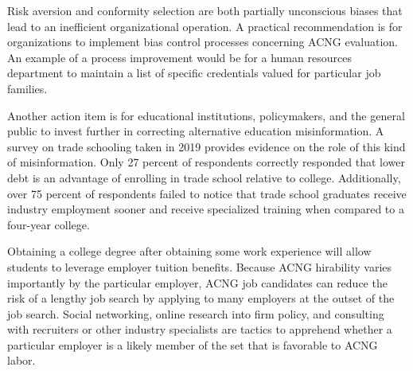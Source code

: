 Risk aversion and conformity selection are both partially unconscious biases that lead to an inefficient organizational operation.
A practical recommendation is for organizations to implement bias control processes concerning ACNG evaluation.
An example of a process improvement would be for a human resources department
to maintain a list of specific credentials valued for particular job families.

Another action item is for educational institutions, policymakers, and the general public to invest further in correcting alternative education misinformation.
A survey on trade schooling taken in 2019 provides evidence on the role of this kind of misinformation\cite{arabia_2019}.
Only 27 percent of respondents correctly responded that lower debt is an advantage of enrolling in trade school relative to college.
Additionally, over 75 percent of respondents failed to notice that trade school graduates receive industry employment sooner
and receive specialized training when compared to a four-year college.

Obtaining a college degree after obtaining some work experience will allow students to leverage employer tuition benefits.
Because ACNG hirability varies importantly by the particular employer, ACNG job candidates can reduce the risk of a lengthy job search by applying to many employers at the outset of the job search.
Social networking, online research into firm policy, and consulting with recruiters or other industry specialists are tactics to apprehend whether a particular employer is a likely member of the set that is favorable to ACNG labor.


